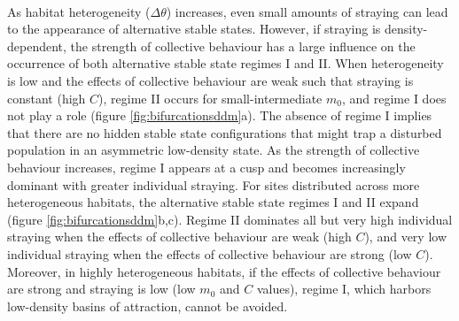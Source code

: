 \documentclass{revtex4}
\begin{document}
\\
As habitat heterogeneity ($\Delta\theta$) increases, even small amounts of straying can lead to the appearance of alternative stable states. %
However, if straying is density-dependent, the strength of collective behaviour has a large influence on the occurrence of both alternative stable state regimes I and II.
When heterogeneity is low and the effects of collective behaviour are weak such that straying is constant (high $C$), regime II occurs for small-intermediate $m_0$, and regime I does not play a role (figure \ref{fig:bifurcationsddm}a).%
The absence of regime I implies that there are no hidden stable state configurations that might trap a disturbed population in an asymmetric low-density state.
As the strength of collective behaviour increases, regime I appears at a cusp and becomes increasingly dominant with greater individual straying.
For sites distributed across more heterogeneous habitats, the alternative stable state regimes I and II expand (figure \ref{fig:bifurcationsddm}b,c).
Regime II dominates all but very high individual straying when the effects of collective behaviour are weak (high $C$), and very low individual straying when the effects of collective behaviour are strong (low $C$).
Moreover, in highly heterogeneous habitats, if the effects of collective behaviour are strong and straying is low (low $m_0$ and $C$ values), regime I, which harbors low-density basins of attraction, cannot be avoided.
\end{document}
